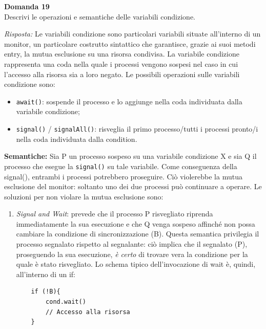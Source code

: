 \documentclass{article}
\newenvironment{problem}[2][Domanda]
    { \begin{mdframed}[backgroundcolor=gray!20] \textbf{#1 #2} \\}
    {  \end{mdframed}}
\newenvironment{solution}
    {\textit{Risposta:}}
    {}
\begin{document}
\begin{problem}{19}
Descrivi le operazioni e semantiche delle variabili condizione.
\end{problem}
\begin{solution}
Le variabili condizione sono particolari variabili situate all’interno di un monitor, un particolare costrutto sintattico che garantisce, grazie ai suoi metodi entry, la mutua esclusione su una risorsa condivisa.
\newline
La variabile condizione rappresenta una coda nella quale i processi vengono sospesi nel caso in cui l’accesso alla risorsa sia a loro negato.
\newline
\newline
Le possibili operazioni sulle variabili condizione sono:
\begin{itemize}
    \item \texttt{await()}: sospende il processo e lo aggiunge nella coda individuata dalla variabile condizione;
    \item \texttt{signal()} / \texttt{signalAll()}: risveglia il primo processo/tutti i processi pronto/i nella coda individuata dalla condition.
\end{itemize}
\textbf{Semantiche:}
\newline
Sia P un processo sospeso su una variabile condizione X e sia Q il processo che esegue la \texttt{signal()} su tale variabile. Come conseguenza della signal(), entrambi i processi potrebbero proseguire.
\newline
Ciò violerebbe la mutua esclusione del monitor: soltanto uno dei due processi può continuare a operare.
Le soluzioni per non violare la mutua esclusione sono:
\begin{enumerate}
    \item \emph{Signal and Wait}: prevede che il processo P risvegliato riprenda immediatamente la sua esecuzione e che Q venga sospeso affinché non possa cambiare la condizione di sincronizzazione (B). Questa semantica privilegia il processo segnalato rispetto al segnalante: ciò implica che il segnalato (P), proseguendo la sua esecuzione, \textit{è certo} di trovare vera la condizione per la quale è stato risvegliato.
    \newline
    \newline
    Lo schema tipico dell’invocazione di wait è, quindi, all’interno di un if:
    \begin{verbatim}
    if (!B){
        cond.wait()
        // Accesso alla risorsa
    }
    \end{verbatim}

\end{enumerate}
\end{solution}
\end{document}
